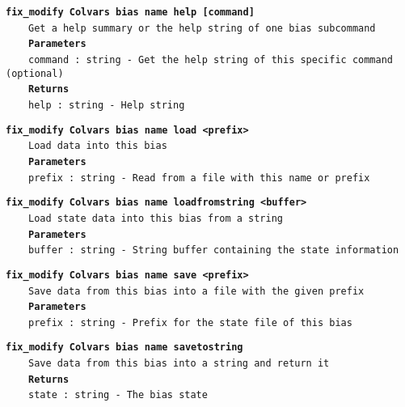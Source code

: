 \begin{mdexampleinput}{}
\texttt{\textbf{fix\_modify Colvars bias name help [command]}}
\\
\-~~~~\texttt{Get a help summary or the help string of one bias subcommand}
\\
\-~~~~\texttt{\textbf{Parameters}}
\\
\-~~~~\texttt{command : string - Get the help string of this specific command (optional)}
\\
\-~~~~\texttt{\textbf{Returns}}
\\
\-~~~~\texttt{help : string - Help string}
\end{mdexampleinput}
\begin{mdexampleinput}{}
\texttt{\textbf{fix\_modify Colvars bias name load <prefix>}}
\\
\-~~~~\texttt{Load data into this bias}
\\
\-~~~~\texttt{\textbf{Parameters}}
\\
\-~~~~\texttt{prefix : string - Read from a file with this name or prefix}
\end{mdexampleinput}
\begin{mdexampleinput}{}
\texttt{\textbf{fix\_modify Colvars bias name loadfromstring <buffer>}}
\\
\-~~~~\texttt{Load state data into this bias from a string}
\\
\-~~~~\texttt{\textbf{Parameters}}
\\
\-~~~~\texttt{buffer : string - String buffer containing the state information}
\end{mdexampleinput}
\begin{mdexampleinput}{}
\texttt{\textbf{fix\_modify Colvars bias name save <prefix>}}
\\
\-~~~~\texttt{Save data from this bias into a file with the given prefix}
\\
\-~~~~\texttt{\textbf{Parameters}}
\\
\-~~~~\texttt{prefix : string - Prefix for the state file of this bias}
\end{mdexampleinput}
\begin{mdexampleinput}{}
\texttt{\textbf{fix\_modify Colvars bias name savetostring}}
\\
\-~~~~\texttt{Save data from this bias into a string and return it}
\\
\-~~~~\texttt{\textbf{Returns}}
\\
\-~~~~\texttt{state : string - The bias state}
\end{mdexampleinput}
